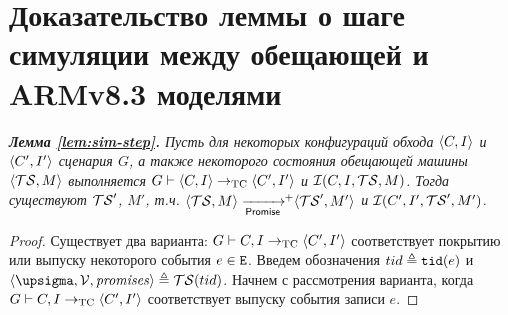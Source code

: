 \chapter{Доказательство леммы о шаге симуляции между обещающей и ARMv8.3 моделями}
\label{sec:sim-step-proof}

  \emph{{\bf Лемма \ref{lem:sim-step}.}
  Пусть для некоторых конфигураций обхода ${\langle{C, I}\rangle}$ и ${\langle{C', I'}\rangle}$ сценария $G$,
  а также некоторого состояния обещающей машины ${\langle{\ensuremath{\mathcal{TS}}, M}\rangle}$ выполняется
  $G \vdash {\langle{C, I}\rangle} \rightarrow_{\rm TC} {\langle{C', I'}\rangle}$ и
  $\mathcal{I}(C, I, \mathcal{TS}, M)$.
  Тогда существуют $\mathcal{TS}'$, $M'$, т.ч. $\tup{\TSf, M} \stepp\!\!^{+} \tup{\TSf', M'}$ и
  $\mathcal{I}(C', I', \mathcal{TS}', M')$.}
\begin{proof}%
  Существует два варианта: $G \vdash C, I \rightarrow_{\rm TC} {\langle{C', I'}\rangle}$ соответствует покрытию или
  выпуску некоторого события $e \in {\mathtt{E}}$. Введем обозначения $tid \triangleq {\mathtt{tid}}(e)$ и
  $\tup{\pstate, \View, \PromSet} \defeq \TSf(tid)$.
  Начнем с рассмотрения варианта, когда $G \vdash C, I \rightarrow_{\rm TC} {\langle{C', I'}\rangle}$ соответствует
  выпуску события записи $e$.


\end{proof}

